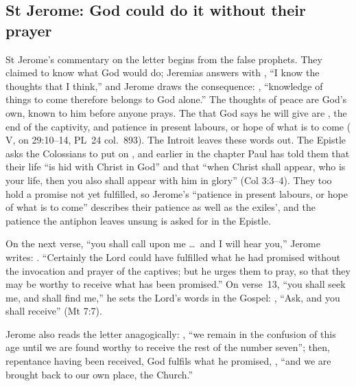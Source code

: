 \subsection{St Jerome: God could do it without their prayer}
\label{sec:captivity-jerome}

St Jerome's commentary on the letter begins from the false prophets. They
claimed to know what God would do; Jeremias answers with , ``I know the thoughts that I think,'' and
Jerome draws the consequence: , ``knowledge of things to come therefore belongs to God alone.''
The thoughts of peace are God's own, known to him before anyone prays. The
 that God says he will give are , the end
of the captivity, and patience in present labours, or hope of what is to come
( V, on 29:10--14, PL~24 col.~893). The Introit leaves
these words out. The Epistle asks the Colossians to put on
, and earlier in the chapter Paul has told them that their
life ``is hid with Christ in God'' and that ``when Christ shall appear, who is
your life, then you also shall appear with him in glory'' (Col 3:3--4). They
too hold a promise not yet fulfilled, so Jerome's ``patience in present
labours, or hope of what is to come'' describes their patience as well as the
exiles', and the patience the antiphon leaves unsung is asked for in the
Epistle.

On the next verse, ``you shall call upon me \dots\ and I will hear you,''
Jerome writes: . ``Certainly the Lord could have fulfilled what he had promised
without the invocation and prayer of the captives; but he urges them to pray,
so that they may be worthy to receive what has been promised.'' On verse~13,
``you shall seek me, and shall find me,'' he sets the Lord's words in the
Gospel: , ``Ask, and you shall receive'' (Mt
7:7).

Jerome also reads the letter anagogically: ,
``we remain in the confusion of this age until we are found worthy to receive
the rest of the number seven''; then, repentance having been received, God
fulfils what he promised, ,
``and we are brought back to our own place, the Church.''

